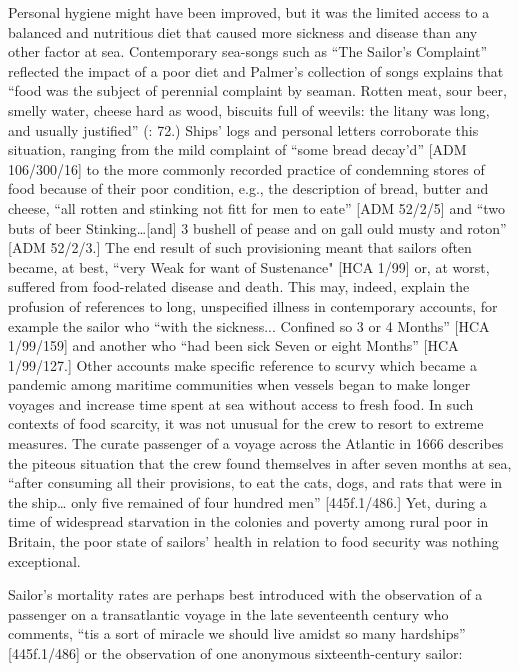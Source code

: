   Personal hygiene might have been improved, but it was the limited access to a balanced and nutritious diet that caused more sickness and disease than any other factor at sea. Contemporary sea-songs such as “The Sailor’s Complaint” reflected the impact of a poor diet and Palmer’s collection of songs explains that “food was the subject of perennial complaint by seaman. Rotten meat, sour beer, smelly water, cheese hard as wood, biscuits full of weevils: the litany was long, and usually justified” (\citealt{Palmer1986}: 72.) Ships’ logs and personal letters corroborate this situation, ranging from the mild complaint of “some bread decay'd” [ADM 106/300/16] to the more commonly recorded practice of condemning stores of food because of their poor condition, e.g., the description of bread, butter and cheese, “all rotten and stinking not fitt for men to eate” [ADM 52/2/5] and “two buts of beer Stinking…[and] 3 bushell of pease and on gall ould musty and roton” [ADM 52/2/3.] The end result of such provisioning meant that sailors often became, at best, “very Weak for want of Sustenance" [HCA 1/99] or, at worst, suffered from food-related disease and death. This may, indeed, explain the profusion of references to long, unspecified illness in contemporary accounts, for example the sailor who “with the sickness... Confined so 3 or 4 Months” [HCA 1/99/159] and another who “had been sick Seven or eight Months” [HCA 1/99/127.] Other accounts make specific reference to scurvy which became a pandemic among maritime communities when vessels began to make longer voyages and increase time spent at sea without access to fresh food. In such contexts of food scarcity, it was not unusual for the crew to resort to extreme measures. The curate passenger of a voyage across the Atlantic in 1666 describes the piteous situation that the crew found themselves in after seven months at sea, “after consuming all their provisions, to eat the cats, dogs, and rats that were in the ship… only five remained of four hundred men” [445f.1/486.] Yet, during a time of widespread starvation in the colonies and poverty among rural poor in Britain, the poor state of sailors’ health in relation to food security was nothing exceptional. 

  Sailor’s mortality rates are perhaps best introduced with the observation of a passenger on a transatlantic voyage in the late seventeenth century who comments, “tis a sort of miracle we should live amidst so many hardships” [445f.1/486] or the observation of one anonymous sixteenth-century sailor:

